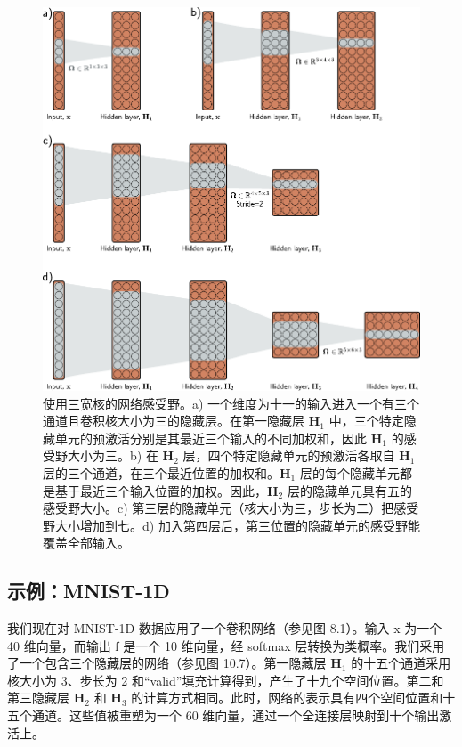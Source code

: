 \documentclass[lang=cn,newtx,10pt,scheme=chinese]{elegantbook}
\begin{document}
\begin{figure}[ht!]
\centering
\includegraphics[width=0.7\linewidth]{PDFFigures/UDLChap10PDF/ConvNetworkRF.pdf}
\caption{使用三宽核的网络感受野。a) 一个维度为十一的输入进入一个有三个通道且卷积核大小为三的隐藏层。在第一隐藏层 \(\mathbf{H}_1\) 中，三个特定隐藏单元的预激活分别是其最近三个输入的不同加权和，因此 \(\mathbf{H}_1\) 的感受野大小为三。b) 在 \(\mathbf{H}_2\) 层，四个特定隐藏单元的预激活各取自 \(\mathbf{H}_1\) 层的三个通道，在三个最近位置的加权和。\(\mathbf{H}_1\) 层的每个隐藏单元都是基于最近三个输入位置的加权。因此，\(\mathbf{H}_2\) 层的隐藏单元具有五的感受野大小。c) 第三层的隐藏单元（核大小为三，步长为二）把感受野大小增加到七。d) 加入第四层后，第三位置的隐藏单元的感受野能覆盖全部输入。}
\end{figure}

\subsection{示例：MNIST-1D}
我们现在对 MNIST-1D 数据应用了一个卷积网络（参见图 8.1）。输入 x 为一个 40 维向量，而输出 f 是一个 10 维向量，经 softmax 层转换为类概率。我们采用了一个包含三个隐藏层的网络（参见图 10.7）。第一隐藏层 \(\mathbf{H}_1\) 的十五个通道采用核大小为 3、步长为 2 和“valid”填充计算得到，产生了十九个空间位置。第二和第三隐藏层 \(\mathbf{H}_2\) 和 \(\mathbf{H}_3\) 的计算方式相同。此时，网络的表示具有四个空间位置和十五个通道。这些值被重塑为一个 60 维向量，通过一个全连接层映射到十个输出激活上。
\end{document}
